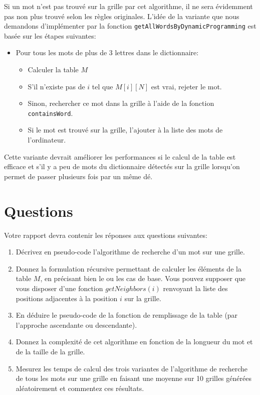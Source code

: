 \documentclass[a4paper,10pt]{article}
\begin{document}
Si un mot n'est pas trouvé sur la grille par cet algorithme, il ne
sera évidemment pas non plus trouvé selon les règles
originales. L'idée de la variante que nous demandons d'implémenter
 par la fonction \texttt{getAllWordsByDynamicProgramming} est basée sur les étapes suivantes:
\begin{itemize}
\item Pour tous les mots de plus de 3 lettres dans le dictionnaire:
\begin{itemize}
\item Calculer la table $M$
\item S'il n'existe pas de $i$ tel que $M[i][N]$ est vrai, rejeter le mot.
\item Sinon, rechercher ce mot dans la grille à l'aide de la fonction
  \texttt{containsWord}.
\item Si le mot est trouvé sur la grille, l'ajouter à la liste des mots de l'ordinateur.
\end{itemize}
\end{itemize}
Cette variante devrait améliorer les performances si le calcul de la
table est efficace et s'il y a peu de mots du dictionnaire détectés
sur la grille lorsqu'on permet de passer plusieurs fois par un même
dé.

\section{Questions}

Votre rapport devra contenir les réponses aux questions suivantes:
\begin{enumerate}
\item Décrivez en pseudo-code l'algorithme de recherche d'un mot sur
  une grille.
\item Donnez la formulation récursive permettant de calculer les
  éléments de la table $M$, en précisant bien le ou les cas de
  base. Vous pouvez supposer que vous disposer d'une fonction
  $getNeighbors(i)$ renvoyant la liste des positions adjacentes à la
  position $i$ sur la grille.
\item En déduire le pseudo-code de la fonction de remplissage de la
  table (par l'approche ascendante ou descendante).
\item Donnez la complexité de cet algorithme en fonction de la
  longueur du mot et de la taille de la grille.
\item Mesurez les temps de calcul des trois variantes de l'algorithme
  de recherche de tous les mots sur une grille en faisant une moyenne
  sur 10 grilles générées aléatoirement et commentez ces résultats.
\end{enumerate}
\end{document}
